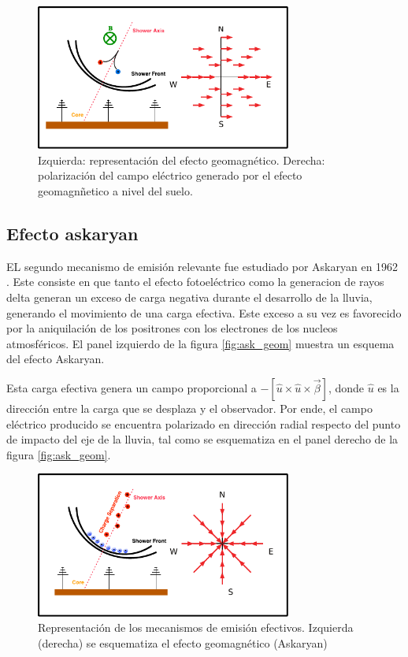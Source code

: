 	\begin{figure}[ht!]
		\centering
		\includegraphics[width=0.75\textwidth]{fig/EASRadio/geom_sketch}
		\caption{\label{fig:geom_sketch} Izquierda: representaci\'on del efecto geomagnético.
		Derecha: polarización del campo eléctrico generado por el efecto geomagnñetico a nivel del suelo.}
	\end{figure}
	
	\subsection{Efecto askaryan}
	
	EL segundo mecanismo de emisión relevante fue estudiado por Askaryan en 1962 \cite{askaryan1962}. Este consiste en que tanto el efecto fotoel\'ectrico como la generacion de rayos delta generan un exceso de carga negativa durante el desarrollo de la lluvia, generando el movimiento de una carga efectiva.
	Este exceso a su vez es favorecido por la aniquilaci\'on de los positrones con los electrones de los nucleos atmosf\'ericos. 
	El panel izquierdo de la figura \ref{fig:ask_geom} muestra un esquema del efecto Askaryan.
	
	Esta carga efectiva genera un campo proporcional a $-\left[\hat u \times \hat u \times \vec\beta\right]$, donde $\hat u$ es la direcci\'on entre la carga que se desplaza y el observador.
	Por ende, el campo eléctrico producido se encuentra polarizado en dirección radial respecto del punto de impacto del eje de la lluvia, tal como se esquematiza en el panel derecho de la figura \ref{fig:ask_geom}.
	
	\begin{figure}[ht!]
		\centering
		\includegraphics[width=0.75\textwidth]{fig/EASRadio/ask_sketch}
		\caption{\label{fig:ask_sketch} Representaci\'on de los mecanismos de emisi\'on efectivos. Izquierda (derecha) se esquematiza el efecto geomagn\'etico (Askaryan)}
	\end{figure}
	
